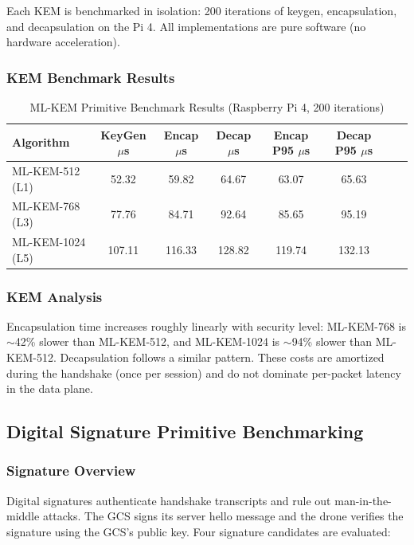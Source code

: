 \documentclass[conference]{IEEEtran}
\begin{document}
Each KEM is benchmarked in isolation: 200 iterations of keygen, encapsulation, and decapsulation on the Pi 4. All implementations are pure software (no hardware acceleration).

\subsubsection{KEM Benchmark Results}

\begin{table}[htbp]
\centering
\caption{ML-KEM Primitive Benchmark Results (Raspberry Pi 4, 200 iterations)}
\begin{tabular}{lccccccc}
\toprule
\textbf{Algorithm} & \textbf{KeyGen $\mu$s} & \textbf{Encap $\mu$s} & \textbf{Decap $\mu$s} & \textbf{Encap P95 $\mu$s} & \textbf{Decap P95 $\mu$s} \\
\midrule
ML-KEM-512 (L1) & 52.32 & 59.82 & 64.67 & 63.07 & 65.63 \\
ML-KEM-768 (L3) & 77.76 & 84.71 & 92.64 & 85.65 & 95.19 \\
ML-KEM-1024 (L5) & 107.11 & 116.33 & 128.82 & 119.74 & 132.13 \\
\bottomrule
\end{tabular}
\end{table}

\subsubsection{KEM Analysis}

Encapsulation time increases roughly linearly with security level: ML-KEM-768 is $\sim$42\% slower than ML-KEM-512, and ML-KEM-1024 is $\sim$94\% slower than ML-KEM-512. Decapsulation follows a similar pattern. These costs are amortized during the handshake (once per session) and do not dominate per-packet latency in the data plane.

\subsection{Digital Signature Primitive Benchmarking}

\subsubsection{Signature Overview}

Digital signatures authenticate handshake transcripts and rule out man-in-the-middle attacks. The GCS signs its server hello message and the drone verifies the signature using the GCS's public key. Four signature candidates are evaluated:
\end{document}
